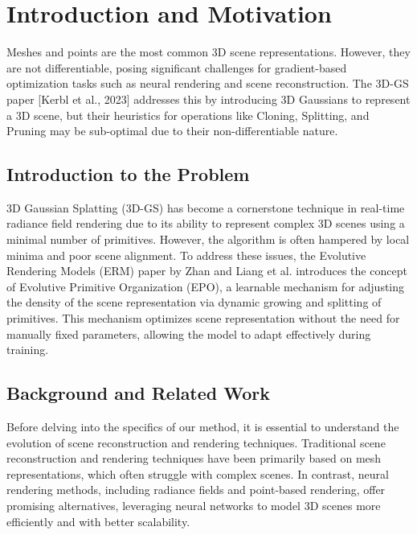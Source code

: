 \documentclass[11pt]{report}
\title{\titleinfo}
\author{\authorinfo}
\date{}
\begin{document}
\maketitle
\thispagestyle{empty} %

\tableofcontents

\chapter{Introduction and Motivation}
Meshes and points are the most common 3D scene representations. However, they are not differentiable, posing significant challenges for gradient-based optimization tasks such as neural rendering and scene reconstruction. The 3D-GS paper [Kerbl et al., 2023] addresses this by introducing 3D Gaussians to represent a 3D scene, but their heuristics for operations like Cloning, Splitting, and Pruning may be sub-optimal due to their non-differentiable nature.

\section{Introduction to the Problem}
3D Gaussian Splatting (3D-GS) has become a cornerstone technique in real-time radiance field rendering due to its ability to represent complex 3D scenes using a minimal number of primitives. However, the algorithm is often hampered by local minima and poor scene alignment. To address these issues, the Evolutive Rendering Models (ERM) paper by Zhan and Liang et al. introduces the concept of Evolutive Primitive Organization (EPO), a learnable mechanism for adjusting the density of the scene representation via dynamic growing and splitting of primitives. This mechanism optimizes scene representation without the need for manually fixed parameters, allowing the model to adapt effectively during training.

\section{Background and Related Work}

Before delving into the specifics of our method, it is essential to understand the evolution of scene reconstruction and rendering techniques. Traditional scene reconstruction and rendering techniques have been primarily based on mesh representations, which often struggle with complex scenes. In contrast, neural rendering methods, including radiance fields and point-based rendering, offer promising alternatives, leveraging neural networks to model 3D scenes more efficiently and with better scalability.
\end{document}
